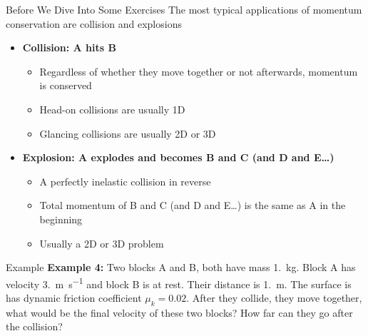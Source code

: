 \documentclass[12pt,compress,aspectratio=169]{beamer}
\begin{document}
\begin{frame}{Before We Dive Into Some Exercises}
  The most typical applications of momentum conservation are collision and
  explosions
  \begin{itemize}
  \item\textbf{Collision: A hits B}
    \begin{itemize}
    \item Regardless of whether they move together or not afterwards, momentum
      is conserved
    \item Head-on collisions are usually 1D
    \item Glancing collisions are usually 2D or 3D
    \end{itemize}
  \item\textbf{Explosion: A explodes and becomes B and C (and D and E\ldots)}
    \begin{itemize}
    \item A perfectly inelastic collision in reverse
    \item Total momentum of B and C (and D and E\ldots) is the same as A in the
      beginning
    \item Usually a 2D or 3D problem
    \end{itemize}
  \end{itemize}
\end{frame}



\begin{frame}{Example}
  \textbf{Example 4:} Two blocks A and B, both have mass \SI{1.}{\kilo\gram}.
  Block A has velocity \SI{3.}{\metre\per\second} and block B is at rest. Their
  distance is \SI{1.}{\metre}. The surface is has dynamic friction coefficient
  $\mu_k=0.02$. After they collide, they move together, what would be the final
  velocity of these two blocks? How far can they go after the collision?
\end{frame}

%
\end{document}
